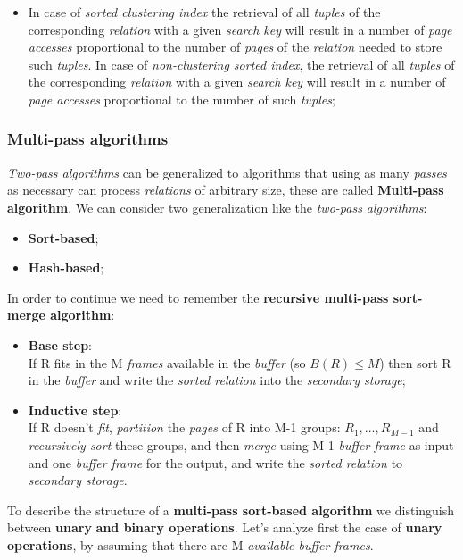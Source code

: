 \documentclass{article}
\begin{document}
\begin{itemize}
\begin{itemize}
\item In case of \emph{sorted clustering index} the retrieval of all \emph{tuples} of the corresponding \emph{relation} with a given \emph{search key} will result in a number of \emph{page accesses} proportional to the number of \emph{pages} of the \emph{relation} needed to store such \emph{tuples}. In case of \emph{non-clustering sorted index}, the retrieval of all \emph{tuples} of the corresponding \emph{relation} with a given \emph{search key} will result in a number of \emph{page accesses} proportional to the number of such \emph{tuples};
\end{itemize}
\end{itemize}
\subsubsection{Multi-pass algorithms}
\emph{Two-pass algorithms} can be generalized to algorithms that using as many \emph{passes} as necessary can process \emph{relations} of arbitrary size, these are called \textbf{Multi-pass algorithm}. We can consider two generalization like the \emph{two-pass algorithms}:
\begin{itemize}
\item \textbf{Sort-based};
\item \textbf{Hash-based};
\end{itemize}
In order to continue we need to remember the \textbf{recursive multi-pass sort-merge algorithm}:
\begin{itemize}
\item \textbf{Base step}:
\vspace{2.5mm}\\
If R fits in the M \emph{frames} available in the \emph{buffer} (so $B(R) \leq M$) then sort R in the \emph{buffer} and write the \emph{sorted relation} into the \emph{secondary storage};
\item \textbf{Inductive step}:
\vspace{2.5mm}\\
If R doesn't \emph{fit}, \emph{partition} the \emph{pages} of R into M-1 groups: $R_1, ... , R_{M-1}$ and \emph{recursively sort} these groups, and then \emph{merge} using M-1\emph{ buffer frame} as input and one \emph{buffer frame} for the output, and write the \emph{sorted relation} to \emph{secondary storage}. 
\end{itemize}
To describe the structure of a \textbf{multi-pass sort-based algorithm} we distinguish between \textbf{unary} \textbf{and binary operations}. Let's analyze first the case of \textbf{unary operations}, by assuming that there are M \emph{available buffer frames}. 
\end{document}
